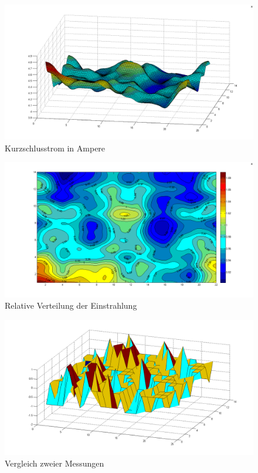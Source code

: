 \documentclass[a4paper,bibtotoc,oneside]{scrbook}
\begin{document}
\begin{figure}[htbp]
\centering
\includegraphics[width=150mm]{img/hugel.png}
\caption[Kurzschlusstrom in Ampere]{Kurzschlusstrom in Ampere}\label{hugel}
\end{figure}



\begin{figure}[htbp]
\centering
\includegraphics[width=150mm]{img/karte1.png}
\caption[Relative Verteilung der Einstrahlung]{Relative Verteilung der Einstrahlung}\label{karte1}
\end{figure}

\begin{figure}[htbp]
\centering
\includegraphics[width=150mm]{img/vergleich23.png}
\caption[Vergleich zweier Messungen]{Vergleich zweier Messungen}\label{vergleich}
\end{figure}
\end{document}
